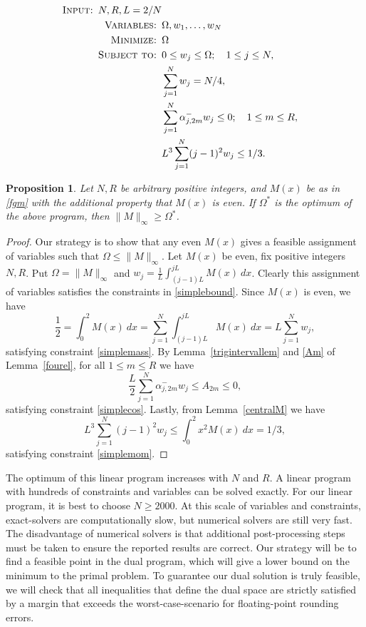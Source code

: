 \documentclass[12pt]{article}
\newtheorem{prop}[theorem]{Proposition}
\numberwithin{equation}{section}
\begin{document}
\begin{align}
\textsc{Input: } N,  R, L = 2/N \nonumber \\
\textsc{Variables: }& \Omega,w_1,\ldots,w_N  \nonumber \\
\textsc{Minimize: } &\Omega   \nonumber\\
\textsc{Subject to: } & 0 \leq w_j \leq \Omega; \quad 1 \leq j \leq N, \label{simplebound} \\
  & \sum_{j=1}^{N}w_j = N/4, \label{simplemass}\\
& \sum_{j=1}^{N} \alpha_{j,2m}^-w_j \leq 0; \quad 1 \leq m \leq R, \label{simplecos} \\
& L^3 \sum_{j=1}^{N}  (j-1)^2 w_j \leq 1/3.\label{simplemom}
\end{align}




\begin{prop} Let $N,R$ be arbitrary positive integers, and $M(x)$ be as in \eqref{fgm} with the additional property that $M(x)$ is even. If $\Omega^*$ is the optimum of the above program, then $\|M\|_{\infty} \geq \Omega^*$. 
\end{prop} 

\begin{proof} Our strategy is to show that any even $M(x)$ gives a feasible assignment of variables such that $\Omega \leq \| M \|_{\infty}$. Let $M(x)$ be even, fix positive integers $N,R$. Put $\Omega = \|M \|_{\infty}$ and $w_j = \frac{1}{L} \int_{(j-1)L}^{jL} M(x) \ dx$. Clearly this assignment of variables satisfies the constraints in \eqref{simplebound}. Since $M(x)$ is even, we have
\[ \frac{1}{2} = \int_{0}^2 M(x) \ dx = \sum_{j=1}^N \int_{(j-1)L}^{jL} M(x) \ dx = L \sum_{j=1}^N w_j,\]
satisfying constraint \eqref{simplemass}. By Lemma~\ref{trigintervallem} and \eqref{Am} of Lemma~\ref{fourel}, for all $1 \leq m \leq R$ we have 
\[ \frac{L}{2} \sum_{j=1}^N \alpha_{j,2m}^- w_j \leq A_{2m} \leq 0 ,\]
satisfying constraint \eqref{simplecos}. Lastly, from Lemma~\ref{centralM} we have 
\[ L^3 \sum_{j=1}^{N}  (j-1)^2 w_j \leq \int_{0}^2 x^2 M(x) \ dx = 1/3,\]
satisfying constraint \eqref{simplemom}.


\end{proof} 

The optimum of this linear program increases with $N$ and $R$. A linear program with hundreds of constraints and variables can be solved exactly. For our linear program, it is best to choose $N \geq 2000$. At this scale of variables and constraints, exact-solvers are computationally slow, but numerical solvers are still very fast. The disadvantage of numerical solvers is that additional post-processing steps must be taken to ensure the reported results are correct. Our strategy will be to find a feasible point in the dual program, which will give a lower bound on the minimum to the primal problem. To guarantee our dual solution is truly feasible, we will check that all inequalities that define the dual space are strictly satisfied by a margin that exceeds the worst-case-scenario for floating-point rounding errors. 
\end{document}
